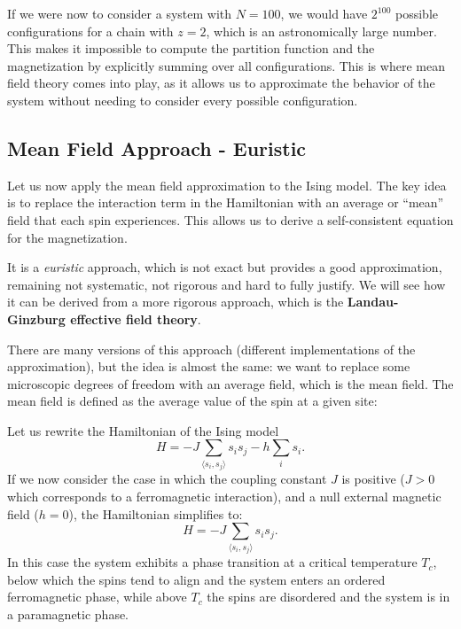 If we were now to consider a system with \(N=100\), we would have \(2^{100}\) possible configurations for a chain with \(z=2\), which is an astronomically large number. This makes it impossible to compute the partition function and the magnetization by explicitly summing over all configurations. This is where mean field theory comes into play, as it allows us to approximate the behavior of the system without needing to consider every possible configuration.

\subsection{Mean Field Approach - Euristic}

Let us now apply the mean field approximation to the Ising model. The key idea is to replace the interaction term in the Hamiltonian with an average or ``mean'' field that each spin experiences. This allows us to derive a self-consistent equation for the magnetization.

It is a \textit{euristic} approach, which is not exact but provides a good approximation, remaining not systematic, not rigorous and hard to fully justify. We will see how it can be derived from a more rigorous approach, which is the \textbf{Landau-Ginzburg effective field theory}.

There are many versions of this approach (different implementations of the approximation), but the idea is almost the same: we want to replace some microscopic degrees of freedom with an average field, which is the mean field. The mean field is defined as the average value of the spin at a given site:

Let us rewrite the Hamiltonian of the Ising model
\[
    H = - J \sum_{\langle s_i, s_j \rangle} s_i s_j - h \sum_i s_i.
\]
If we now consider the case in which the coupling constant \(J\) is positive (\(J>0\) which corresponds to a ferromagnetic interaction), and a null external magnetic field (\(h=0\)), the Hamiltonian simplifies to:
\[
    H = - J \sum_{\langle s_i, s_j \rangle} s_i s_j.
\]
In this case the system exhibits a phase transition at a critical temperature \(T_c\), below which the spins tend to align and the system enters an ordered ferromagnetic phase, while above \(T_c\) the spins are disordered and the system is in a paramagnetic phase.

